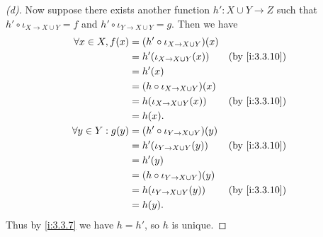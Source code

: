 \begin{proof}[(d)]
  Now suppose there exists another function \(h' : X \cup Y \to Z\) such that \(h' \circ \iota_{X \to X \cup Y} = f\) and \(h' \circ \iota_{Y \to X \cup Y} = g\).
  Then we have
  \begin{align*}
    \forall x \in X, f(x)  & = (h' \circ \iota_{X \to X \cup Y})(x)                    \\
                           & = h'(\iota_{X \to X \cup Y}(x))        &  & \by{i:3.3.10} \\
                           & = h'(x)                                                   \\
                           & = (h \circ \iota_{X \to X \cup Y})(x)                     \\
                           & = h(\iota_{X \to X \cup Y}(x))         &  & \by{i:3.3.10} \\
                           & = h(x).                                                   \\
    \forall y \in Y : g(y) & = (h' \circ \iota_{Y \to X \cup Y})(y)                    \\
                           & = h'(\iota_{Y \to X \cup Y}(y))        &  & \by{i:3.3.10} \\
                           & = h'(y)                                                   \\
                           & = (h \circ \iota_{Y \to X \cup Y})(y)                     \\
                           & = h(\iota_{Y \to X \cup Y}(y))         &  & \by{i:3.3.10} \\
                           & = h(y).
  \end{align*}
  Thus by \cref{i:3.3.7} we have \(h = h'\), so \(h\) is unique.
\end{proof}
